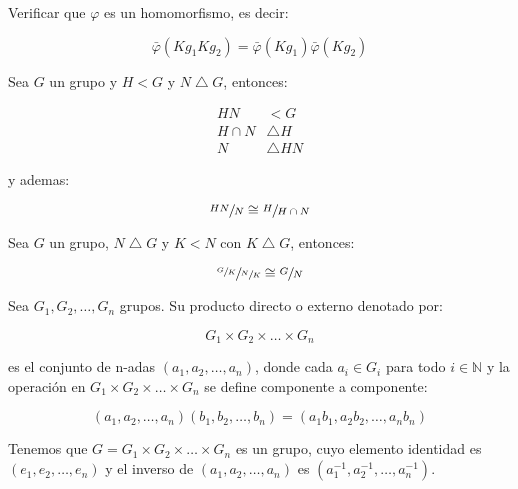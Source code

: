         \begin{ejercicio}
            Verificar que $\varphi$ es un homomorfismo, es decir:

            \begin{equation*}
                \bar{\varphi}(Kg_1 Kg_2) = \bar{\varphi}(Kg_1) \bar{\varphi}(Kg_2)
            \end{equation*}
        \end{ejercicio}

        \begin{teorema}
            Sea $G$ un grupo y $H < G$ y $N \bigtriangleup G$, entonces:

            \begin{align}
                HN &< G \\
                H \cap N &\bigtriangleup H \\
                N &\bigtriangleup HN
            \end{align}

            y ademas:

            \begin{equation}
                \sfrac{HN}{N} \cong \sfrac{H}{H \cap N}
            \end{equation}
        \end{teorema}

        \begin{teorema}
            Sea $G$ un grupo, $N \bigtriangleup G$ y $K < N$ con $K \bigtriangleup G$, entonces:

            \begin{equation}
                \sfrac{\sfrac{G}{K}}{\sfrac{N}{K}} \cong \sfrac{G}{N}
            \end{equation}

            Sea $G_1, G_2, \dots, G_n$ grupos. Su producto directo o externo denotado por:

            \begin{equation}
                G_1 \times G_2 \times \dots \times G_n
            \end{equation}

            es el conjunto de n-adas $(a_1, a_2, \dots, a_n)$, donde cada $a_i \in G_i$ para todo $i \in \mathbb{N}$ y la operación en $G_1 \times G_2 \times \dots \times G_n$ se define componente a componente:

            \begin{equation}
                \left( a_1, a_2, \dots, a_n \right) \left( b_1, b_2, \dots, b_n \right) = \left( a_1 b_1, a_2 b_2, \dots, a_n b_n \right)
            \end{equation}

            Tenemos que $G = G_1 \times G_2 \times \dots \times G_n$ es un grupo, cuyo elemento identidad es $(e_1, e_2, \dots, e_n)$ y el inverso de $(a_1, a_2, \dots, a_n)$ es $(a_1^{-1}, a_2^{-1}, \dots, a_n^{-1})$.
        \end{teorema}

